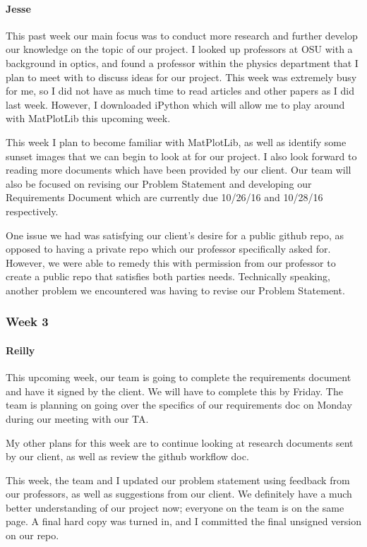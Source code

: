 \documentclass[onecolumn, draftclsnofoot,10pt, compsoc]{IEEEtran}
\begin{document}
\begin{flushleft}
\paragraph{Jesse}
 
This past week our main focus was to conduct more research and further develop our knowledge on the topic of our project. I looked up professors at OSU with a background in optics, and found a professor within the physics department that I plan to meet with to discuss ideas for our project. This week was extremely busy for me, so I did not have as much time to read articles and other papers as I did last week. However, I downloaded iPython which will allow me to play around with MatPlotLib this upcoming week.
 
 
This week I plan to become familiar with MatPlotLib, as well as identify some sunset images that we can begin to look at for our project. I also look forward to reading more documents which have been provided by our client. Our team will also be focused on revising our Problem Statement and developing our Requirements Document which are currently due 10/26/16 and 10/28/16 respectively.
 
 
One issue we had was satisfying our client's desire for a public github repo, as opposed to having a private repo which our professor specifically asked for. However, we were able to remedy this with permission from our professor to create a public repo that satisfies both parties needs. Technically speaking, another problem we encountered was having to revise our Problem Statement.
 
\subsubsection{Week 3}
\paragraph{Reilly}
 
This upcoming week, our team is going to complete the requirements document and have it signed by the client. We will have to complete this by Friday. The team is planning on going over the specifics of our requirements doc on Monday during our meeting with our TA.
 
My other plans for this week are to continue looking at research documents sent by our client, as well as review the github workflow doc.
 
 
This week, the team and I updated our problem statement using feedback from our professors, as well as suggestions from our client. We definitely have a much better understanding of our project now; everyone on the team is on the same page. A final hard copy was turned in, and I committed the final unsigned version on our repo.
 

\end{flushleft}
\end{document}
